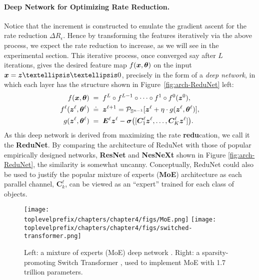 \documentclass[\toplevelprefix/book-main.tex]{subfiles}
\begin{document}
\paragraph{Deep Network for Optimizing Rate Reduction.} Notice that the increment is constructed to emulate the gradient ascent for the rate reduction $\Delta R_\epsilon$. Hence by transforming the features iteratively via the above process, we expect the rate reduction to increase, as we will see in the experimental section. This iterative process, once converged say after $L$ iterations, gives the desired feature map $f(\bm{x}, \bm \theta)$ on the input $\x = \z……0 $, precisely in the form of a {\em deep network}, in which each layer has the structure shown in Figure~\ref{fig:arch-ReduNet} left:
\begin{equation}\label{eqn:ReduNet}
\begin{aligned}
f(\bm{x}, \bm \theta)\; =&  \;\;f^L \circ f^{L-1} \circ  \cdots \circ f^1 \circ
    f^0(\bm{z}^0),  \\ 
f^\ell(\bm{z}^\ell, \bm \theta^\ell) \; \doteq & \;\; \bm{z}^{\ell+1} = \mathcal{P}_{\mathbb{S}^{n-1}}[\bm{z}^{\ell} + \eta\cdot g(\bm{z}^{\ell}, \bm \theta^{\ell})], \\
g(\bm{z}^{\ell}, \bm \theta^{\ell}) \; =&\;\; \bm E^{\ell} \bm{z}^{\ell} -  \bm \sigma\big([\bm{C}^{\ell}_{1} \bm{z}^{\ell}, \dots, \bm{C}^{\ell}_{K} \bm{z}^{\ell}]\big).
\end{aligned}
\end{equation}
As this deep network is derived from maximizing the rate \textbf{redu}cation, we call it the \textbf{ReduNet}. By comparing the architecture of ReduNet with those of popular empirically designed networks, \textbf{ResNet} and \textbf{NesNeXt} shown in Figure \ref{fig:arch-ReduNet}, the similarity is somewhat uncanny. Conceptually, ReduNet could also be used to justify the popular mixture of experts (\textbf{MoE}) architecture \cite{MoE} as each parallel channel, $\bm{C}^{\ell}_k$, can be viewed as an ``expert'' trained for each class of objects.

\begin{figure}[t]
    \centering
    \texttt{[image: \\toplevelprefix/chapters/chapter4/figs/MoE.png]} \hspace{5mm}
    \texttt{[image: \\toplevelprefix/chapters/chapter4/figs/switched-transformer.png]}
    \caption{Left: a mixture of experts (MoE) deep network \cite{MoE}. Right: a sparsity-promoting Switch Transformer \cite{Fedus-2022}, used to implement MoE with 1.7 trillion parameters.}
    \label{fig:enter-label}
\end{figure}
\end{document}
